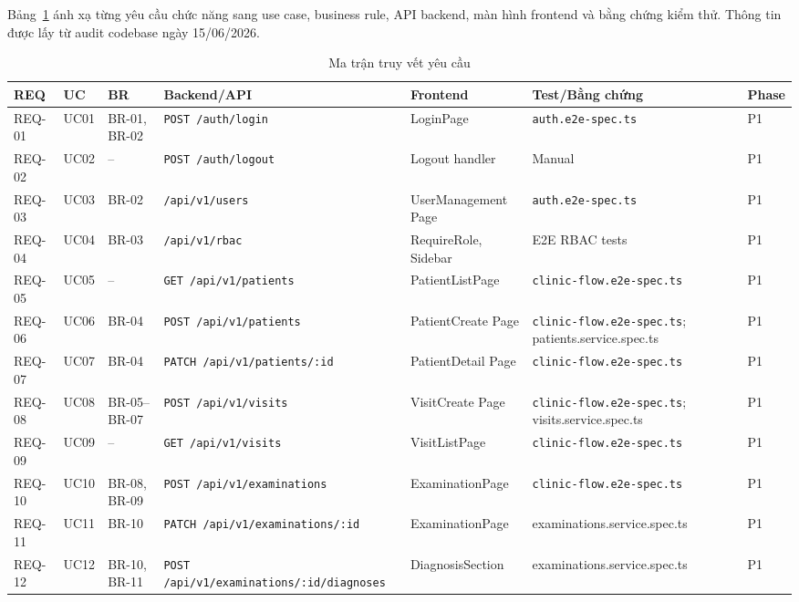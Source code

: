 Bảng~\ref{tab:srs-trace} ánh xạ từng yêu cầu chức năng sang use case, business rule, API backend, màn hình frontend và bằng chứng kiểm thử. Thông tin được lấy từ audit codebase ngày 15/06/2026.

\begin{longtable}{|p{1.3cm}|p{1.3cm}|p{1.6cm}|p{2.7cm}|p{2.2cm}|p{2.5cm}|p{1.3cm}|}
\caption{Ma trận truy vết yêu cầu}
\label{tab:srs-trace}\\
\hline
\textbf{REQ} & \textbf{UC} & \textbf{BR} & \textbf{Backend/API} & \textbf{Frontend} & \textbf{Test/Bằng chứng} & \textbf{Phase} \\
\hline
\endhead
\hline
\endfoot
REQ-01 & UC01 & BR-01, BR-02 & \texttt{POST /auth/login} & LoginPage & \texttt{auth.e2e-spec.ts} & P1 \\
\hline
REQ-02 & UC02 & -- & \texttt{POST /auth/logout} & Logout handler & Manual & P1 \\
\hline
REQ-03 & UC03 & BR-02 & \texttt{/api/v1/users} & UserManagement Page & \texttt{auth.e2e-spec.ts} & P1 \\
\hline
REQ-04 & UC04 & BR-03 & \texttt{/api/v1/rbac} & RequireRole, Sidebar & E2E RBAC tests & P1 \\
\hline
REQ-05 & UC05 & -- & \texttt{GET /api/v1/patients} & PatientListPage & \texttt{clinic-flow.e2e-spec.ts} & P1 \\
\hline
REQ-06 & UC06 & BR-04 & \texttt{POST /api/v1/patients} & PatientCreate Page & \texttt{clinic-flow.e2e-spec.ts}; patients.service.spec.ts & P1 \\
\hline
REQ-07 & UC07 & BR-04 & \texttt{PATCH /api/v1/patients/:id} & PatientDetail Page & \texttt{clinic-flow.e2e-spec.ts} & P1 \\
\hline
REQ-08 & UC08 & BR-05--BR-07 & \texttt{POST /api/v1/visits} & VisitCreate Page & \texttt{clinic-flow.e2e-spec.ts}; visits.service.spec.ts & P1 \\
\hline
REQ-09 & UC09 & -- & \texttt{GET /api/v1/visits} & VisitListPage & \texttt{clinic-flow.e2e-spec.ts} & P1 \\
\hline
REQ-10 & UC10 & BR-08, BR-09 & \texttt{POST /api/v1/examinations} & ExaminationPage & \texttt{clinic-flow.e2e-spec.ts} & P1 \\
\hline
REQ-11 & UC11 & BR-10 & \texttt{PATCH /api/v1/examinations/:id} & ExaminationPage & examinations.service.spec.ts & P1 \\
\hline
REQ-12 & UC12 & BR-10, BR-11 & \texttt{POST /api/v1/examinations/:id/diagnoses} & DiagnosisSection & examinations.service.spec.ts & P1 \\

\end{longtable}
